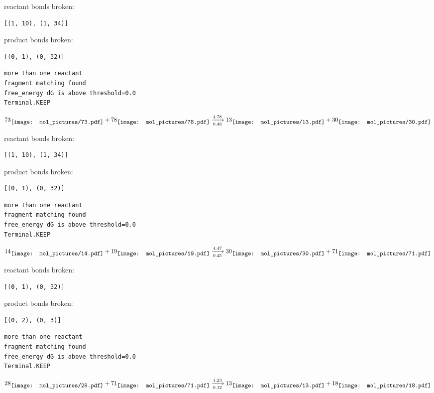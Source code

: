 \documentclass{article}
\begin{document}
reactant bonds broken:\begin{verbatim}
[(1, 10), (1, 34)]
\end{verbatim}
product bonds broken:\begin{verbatim}
[(0, 1), (0, 32)]
\end{verbatim}




\vspace{1cm}
\begin{verbatim}
more than one reactant
fragment matching found
free_energy dG is above threshold=0.0
Terminal.KEEP
\end{verbatim}
$$
73
\raisebox{-.5\height}{\texttt{[image: mol\_pictures/73.pdf]}}
+
78
\raisebox{-.5\height}{\texttt{[image: mol\_pictures/78.pdf]}}
\xrightarrow[0.48]{4.78}
13
\raisebox{-.5\height}{\texttt{[image: mol\_pictures/13.pdf]}}
+
30
\raisebox{-.5\height}{\texttt{[image: mol\_pictures/30.pdf]}}
$$


reactant bonds broken:\begin{verbatim}
[(1, 10), (1, 34)]
\end{verbatim}
product bonds broken:\begin{verbatim}
[(0, 1), (0, 32)]
\end{verbatim}




\vspace{1cm}
\begin{verbatim}
more than one reactant
fragment matching found
free_energy dG is above threshold=0.0
Terminal.KEEP
\end{verbatim}
$$
14
\raisebox{-.5\height}{\texttt{[image: mol\_pictures/14.pdf]}}
+
19
\raisebox{-.5\height}{\texttt{[image: mol\_pictures/19.pdf]}}
\xrightarrow[0.45]{4.47}
30
\raisebox{-.5\height}{\texttt{[image: mol\_pictures/30.pdf]}}
+
71
\raisebox{-.5\height}{\texttt{[image: mol\_pictures/71.pdf]}}
$$


reactant bonds broken:\begin{verbatim}
[(0, 1), (0, 32)]
\end{verbatim}
product bonds broken:\begin{verbatim}
[(0, 2), (0, 3)]
\end{verbatim}




\vspace{1cm}
\begin{verbatim}
more than one reactant
fragment matching found
free_energy dG is above threshold=0.0
Terminal.KEEP
\end{verbatim}
$$
28
\raisebox{-.5\height}{\texttt{[image: mol\_pictures/28.pdf]}}
+
71
\raisebox{-.5\height}{\texttt{[image: mol\_pictures/71.pdf]}}
\xrightarrow[0.12]{1.23}
13
\raisebox{-.5\height}{\texttt{[image: mol\_pictures/13.pdf]}}
+
18
\raisebox{-.5\height}{\texttt{[image: mol\_pictures/18.pdf]}}
$$
\end{document}
